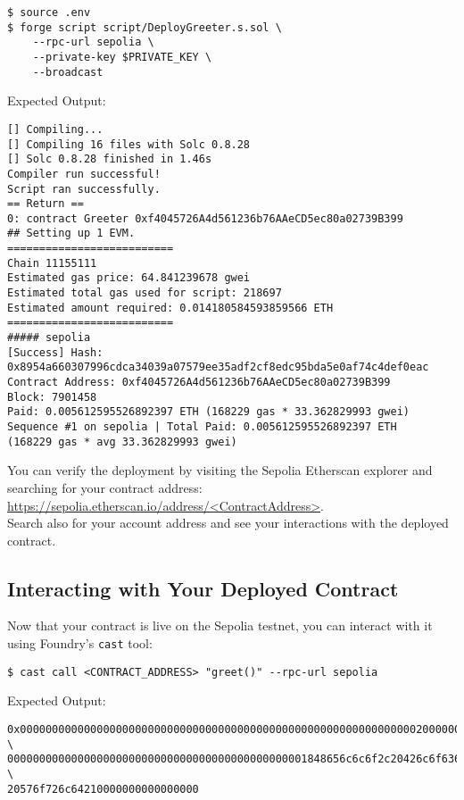 \documentclass[12pt]{article}
\begin{document}
\begin{verbatim}
$ source .env
$ forge script script/DeployGreeter.s.sol \
    --rpc-url sepolia \
    --private-key $PRIVATE_KEY \
    --broadcast
\end{verbatim}

\noindent
Expected Output:
\begin{verbatim}
[] Compiling...
[] Compiling 16 files with Solc 0.8.28
[] Solc 0.8.28 finished in 1.46s
Compiler run successful!
Script ran successfully.
== Return ==
0: contract Greeter 0xf4045726A4d561236b76AAeCD5ec80a02739B399
## Setting up 1 EVM.
==========================
Chain 11155111
Estimated gas price: 64.841239678 gwei
Estimated total gas used for script: 218697
Estimated amount required: 0.014180584593859566 ETH
==========================
##### sepolia
[Success] Hash: 0x8954a660307996cdca34039a07579ee35adf2cf8edc95bda5e0af74c4def0eac
Contract Address: 0xf4045726A4d561236b76AAeCD5ec80a02739B399
Block: 7901458
Paid: 0.005612595526892397 ETH (168229 gas * 33.362829993 gwei)
Sequence #1 on sepolia | Total Paid: 0.005612595526892397 ETH 
(168229 gas * avg 33.362829993 gwei)
\end{verbatim}

You can verify the deployment by visiting the Sepolia Etherscan explorer and searching for your contract address: \\ \url{https://sepolia.etherscan.io/address/<ContractAddress>}. \\ Search also for your account address and see your interactions with the deployed contract.

\subsection{Interacting with Your Deployed Contract}

Now that your contract is live on the Sepolia testnet, you can interact with it using Foundry's \texttt{cast} tool:

\begin{verbatim}
$ cast call <CONTRACT_ADDRESS> "greet()" --rpc-url sepolia
\end{verbatim}

Expected Output:
\begin{verbatim}
0x00000000000000000000000000000000000000000000000000000000000000200000000000000000 \
00000000000000000000000000000000000000000000001848656c6c6f2c20426c6f636b636861696e \
20576f726c64210000000000000000
\end{verbatim}
\end{document}
